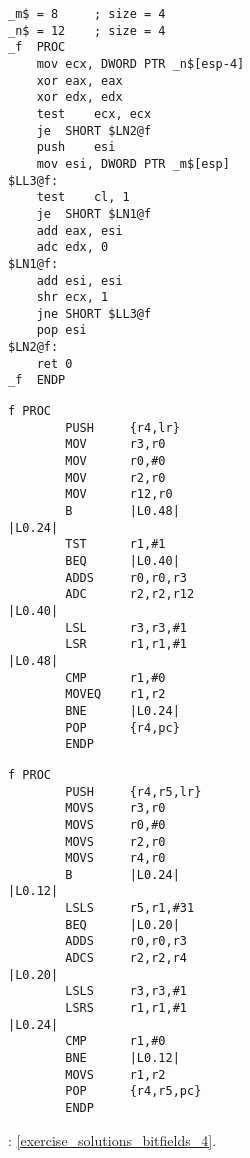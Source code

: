 \begin{lstlisting}[caption=MSVC 2010 /Ox]
_m$ = 8		; size = 4
_n$ = 12	; size = 4
_f	PROC
	mov	ecx, DWORD PTR _n$[esp-4]
	xor	eax, eax
	xor	edx, edx
	test	ecx, ecx
	je	SHORT $LN2@f
	push	esi
	mov	esi, DWORD PTR _m$[esp]
$LL3@f:
	test	cl, 1
	je	SHORT $LN1@f
	add	eax, esi
	adc	edx, 0
$LN1@f:
	add	esi, esi
	shr	ecx, 1
	jne	SHORT $LL3@f
	pop	esi
$LN2@f:
	ret	0
_f	ENDP
\end{lstlisting}

\begin{lstlisting}[caption=\Optimizing{} Keil 5.03 (\ARMMode)]
f PROC
        PUSH     {r4,lr}
        MOV      r3,r0
        MOV      r0,#0
        MOV      r2,r0
        MOV      r12,r0
        B        |L0.48|
|L0.24|
        TST      r1,#1
        BEQ      |L0.40|
        ADDS     r0,r0,r3
        ADC      r2,r2,r12
|L0.40|
        LSL      r3,r3,#1
        LSR      r1,r1,#1
|L0.48|
        CMP      r1,#0
        MOVEQ    r1,r2
        BNE      |L0.24|
        POP      {r4,pc}
        ENDP
\end{lstlisting}

\begin{lstlisting}[caption=\Optimizing{} Keil 5.03 (\ThumbMode)]
f PROC
        PUSH     {r4,r5,lr}
        MOVS     r3,r0
        MOVS     r0,#0
        MOVS     r2,r0
        MOVS     r4,r0
        B        |L0.24|
|L0.12|
        LSLS     r5,r1,#31
        BEQ      |L0.20|
        ADDS     r0,r0,r3
        ADCS     r2,r2,r4
|L0.20|
        LSLS     r3,r3,#1
        LSRS     r1,r1,#1
|L0.24|
        CMP      r1,#0
        BNE      |L0.12|
        MOVS     r1,r2
        POP      {r4,r5,pc}
        ENDP
\end{lstlisting}

\Answer{}: \ref{exercise_solutions_bitfields_4}.
